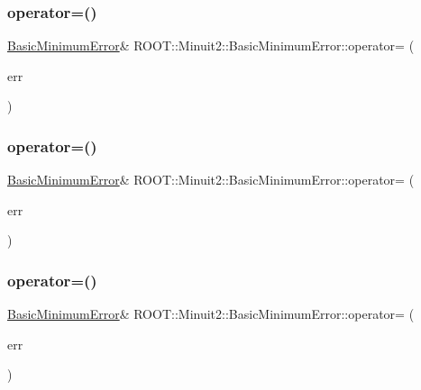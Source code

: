\subsubsection{\texorpdfstring{operator=()}{operator=()}\hspace{0.1cm}{\footnotesize\ttfamily [1/3]}}
{\footnotesize\ttfamily \mbox{\hyperlink{classROOT_1_1Minuit2_1_1BasicMinimumError}{Basic\+Minimum\+Error}}\& R\+O\+O\+T\+::\+Minuit2\+::\+Basic\+Minimum\+Error\+::operator= (\begin{DoxyParamCaption}\item[{const \mbox{\hyperlink{classROOT_1_1Minuit2_1_1BasicMinimumError}{Basic\+Minimum\+Error}} \&}]{err }\end{DoxyParamCaption})\hspace{0.3cm}{\ttfamily [inline]}}

\mbox{\label{classROOT_1_1Minuit2_1_1BasicMinimumError_a83389971838f6e91a3b632604c227571}} 
\subsubsection{\texorpdfstring{operator=()}{operator=()}\hspace{0.1cm}{\footnotesize\ttfamily [2/3]}}
{\footnotesize\ttfamily \mbox{\hyperlink{classROOT_1_1Minuit2_1_1BasicMinimumError}{Basic\+Minimum\+Error}}\& R\+O\+O\+T\+::\+Minuit2\+::\+Basic\+Minimum\+Error\+::operator= (\begin{DoxyParamCaption}\item[{const \mbox{\hyperlink{classROOT_1_1Minuit2_1_1BasicMinimumError}{Basic\+Minimum\+Error}} \&}]{err }\end{DoxyParamCaption})\hspace{0.3cm}{\ttfamily [inline]}}

\mbox{\label{classROOT_1_1Minuit2_1_1BasicMinimumError_a83389971838f6e91a3b632604c227571}} 
\subsubsection{\texorpdfstring{operator=()}{operator=()}\hspace{0.1cm}{\footnotesize\ttfamily [3/3]}}
{\footnotesize\ttfamily \mbox{\hyperlink{classROOT_1_1Minuit2_1_1BasicMinimumError}{Basic\+Minimum\+Error}}\& R\+O\+O\+T\+::\+Minuit2\+::\+Basic\+Minimum\+Error\+::operator= (\begin{DoxyParamCaption}\item[{const \mbox{\hyperlink{classROOT_1_1Minuit2_1_1BasicMinimumError}{Basic\+Minimum\+Error}} \&}]{err }\end{DoxyParamCaption})\hspace{0.3cm}{\ttfamily [inline]}}




